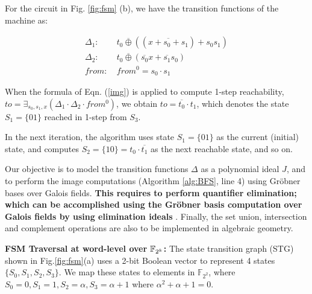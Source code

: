 \begin{example}
For the circuit in Fig. \ref{fig:fsm} (b), we have the transition
functions of the machine as:

\begin{align*}
\Delta_1: & ~t_0 \overline{\oplus} ((\overline{x + s_0 + s_1}) + s_0 s_1)\\
\Delta_2: & ~t_0 \overline{\oplus} (\overline{s_0}x + \overline{s_1}s_0)\\
from:     & ~from^0 = s_0\cdot s_1
\end{align*}



When the formula of Eqn. (\ref{img}) is applied to compute 1-step
reachability, $to = \exists _{s_0, s_1, x} (\Delta_1 \cdot \Delta_2
\cdot from^0)$, we obtain $to = \overline{t_0}\cdot t_1$, which denotes
the state $S_1 = \{01\}$ reached in 1-step from $S_3$.

In the next iteration, the algorithm uses state $S_1 = \{01\}$ as the
current (initial) state, and computes $S_2 = \{10\} = t_0\cdot
\overline{t_1}$ as the next reachable state, and so on. 
\end{example}


Our objective is to model the transition functions $\Delta$ as a
polynomial ideal $J$, and to perform the image computations (Algorithm
\ref{alg:BFS}, line 4) using Gr\"obner bases over Galois fields. {\bf
This requires to perform quantifier elimination; which can be
accomplished using the Gr\"obner basis computation over Galois fields
by using elimination ideals} \cite{gao:qe-gf-gb}. Finally, the set
union,  intersection and complement operations are also to be
implemented in algebraic geometry.

{\bf FSM Traversal at word-level over ${\mathbb{F}}_{2^k}$:} 
The state transition graph (STG) shown in Fig.\ref{fig:fsm}(a) uses a
2-bit Boolean vector to represent 4 states $\{S_0, S_1, S_2,
S_3\}$. We map these states to elements in $\mathbb{F}_{2^2}$, where
$S_0 = 0, S_1 = 1, S_2 = \alpha, S_3 = \alpha+1$ where $\alpha^2 +
\alpha + 1 = 0$. 

